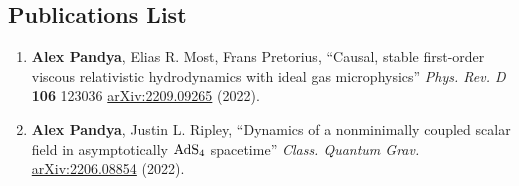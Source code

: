 \documentclass[margin,line,11pt]{resume}
\edef\hc{\string:} %
\begin{document}
\begin{resume}
%

\section{\mysidestyle Publications List}
\begin{enumerate}
\item \textbf{Alex Pandya}, Elias R. Most, Frans Pretorius, ``Causal, stable first-order viscous relativistic hydrodynamics with ideal gas microphysics'' \textit{Phys. Rev. D} \textbf{106} 123036 \href{https://arxiv.org/abs/2209.09265}{arXiv\hc2209.09265} (2022).
\vspace{2mm}

\item \textbf{Alex Pandya}, Justin L. Ripley, ``Dynamics of a nonminimally coupled scalar field in asymptotically $\textnormal{AdS}_{4}$ spacetime'' \textit{Class. Quantum Grav.} \href{https://arxiv.org/abs/2206.08854}{arXiv\hc2206.08854} (2022).
\vspace{2mm}


\end{enumerate}
\end{resume}
\end{document}
